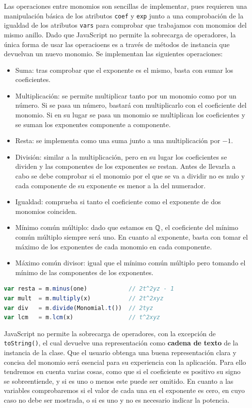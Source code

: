 Las operaciones entre monomios son sencillas de implementar, pues requieren una manipulación básica de los atributos \texttt{coef} y \texttt{exp} junto a una comprobación de la igualdad de los atributos \texttt{vars} para comprobar que trabajamos con monomios del mismo anillo. Dado que JavaScript no permite la sobrecarga de operadores, la única forma de usar las operacioens es a través de métodos de instancia que devuelvan un nuevo monomio. Se implementan las siguientes operaciones:
\begin{itemize}
    \item Suma: tras comprobar que el exponente es el mismo, basta con sumar los coeficientes.
    \item Multiplicación: se permite multiplicar tanto por un monomio como por un número. Si se pasa un número, bastará con multiplicarlo con el coeficiente del monomio. Si en su lugar se pasa un monomio se multiplican los coeficientes y se suman los exponentes componente a componente.
    \item Resta: se implementa como una suma junto a una multiplicación por $-1$.
    \item División: similar a la multiplicación, pero en su lugar los coeficientes se dividen y las componentes de los exponentes se restan. Antes de llevarla a cabo se debe comprobar si el monomio por el que se va a dividir no es nulo y cada componente de su exponente es menor a la del numerador. 
    \item Igualdad: comprueba si tanto el coeficiente como el exponente de dos monomios coinciden.
    \item Mínimo común múltiplo: dado que estamos en $\mathbb{Q}$, el coeficiente del mínimo común múltiplo siempre será uno. En cuanto al exponente, basta con tomar el máximo de los exponentes de cada monomio en cada componente.
    \item Máximo común divisor: igual que el mínimo común múltiplo pero tomando el mínimo de las componentes de los exponentes.
\end{itemize}
\begin{lstlisting}[language=Javascript]
var resta = m.minus(one)            // 2t^2yz - 1
var mult  = m.multiply(x)           // 2t^2xyz
var div   = m.divide(Monomial.t())  // 2tyz
var lcm   = m.lcm(x)                // t^2xyz
\end{lstlisting}

JavaScript no permite la sobrecarga de operadores, con la excepción de \texttt{toString()}, el cual devuelve una representación como \textbf{cadena de texto} de la instancia de la clase. Que el usuario obtenga una buena representación clara y concisa del monomio será esencial para su experiencia con la aplicación. Para ello tendremos en cuenta varias cosas, como que si el coeficiente es positivo su signo se sobreentiende, y si es uno o menos este puede ser omitido. En cuanto a las variables comprobaremos si el valor de cada una en el exponente es cero, en cuyo caso no debe ser mostrada, o si es uno y no es necesario indicar la potencia.


